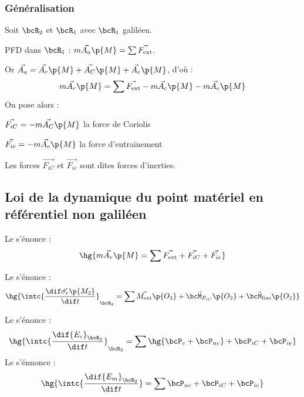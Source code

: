     \subsubsection{Généralisation}
    
    Soit $\bcR_2$ et $\bcR_1$ avec $\bcR_1$ galiléen.
    
    PFD dans $\bcR_1$ : $m\vec{A_a}\p{M} = \sum \vec{F_\text{ext}}$.
    
    Or $\vec{A_a} = \vec{A_r}\p{M} + \vec{A_C}\p{M} + \vec{A_e}\p{M}$, d'où :
    \[ m\vec{A_r}\p{M} = \sum \vec{F_\text{ext}} - m\vec{A_c}\p{M} - m\vec{A_e}\p{M}\]
    On pose alors :
    \begin{enumerate}
        \itt $\vec{F_{iC}} = -m\vec{A_C}\p{M}$ la force de \textsf{Coriolis}
        
        \itt $\vec{F_{ie}} = -m\vec{A_e}\p{M}$ la force d'entrainement
        
        \itt Les forces $\vec{F_{iC}}$ et $\vec{F_{ie}}$ sont dites forces d'inerties.
    \end{enumerate}
    
    \subsection{Loi de la dynamique du point matériel en référentiel non galiléen}
    
    \begin{form}{}{}
        \begin{enumerate}
            \itt Le  s'énonce :
            \[ \hg{m\vec{A_r}\p{M} = \sum \vec{F_\text{ext}} + \vec{F_{iC}} + \vec{F_{ie}}}\]
            
            \itt Le  s'énonce :
            \[ \hg{\intc{\dfrac{\dif \vec{\sigma_r}\p{M_2}}{\dif t}}_{\bcR_2} = \sum \vec{M_\text{ext}}\p{O_2} + \vec{\bcM_{F_{iC}}}\p{O_2} + \vec{\bcM_\text{fixe}}\p{O_2}} \]
            
            \itt Le  s'énonce :
            \[ \hg{\intc{\dfrac{\dif {E_c}_{\bcR_2}}{\dif t}}_{\bcR_2} = \sum \hg{\bcP_{c} + \bcP_{nc}} + \bcP_{iC} + \bcP_{ie}}\]
            \itt Le  s'énnonce :
            \[ \hg{\intc{\dfrac{\dif {E_m}_{\bcR_2}}{\dif t}} = \sum \bcP_{nc} + \bcP_{iC} + \bcP_{ie}}\]
        \end{enumerate}
    \end{form}
    
